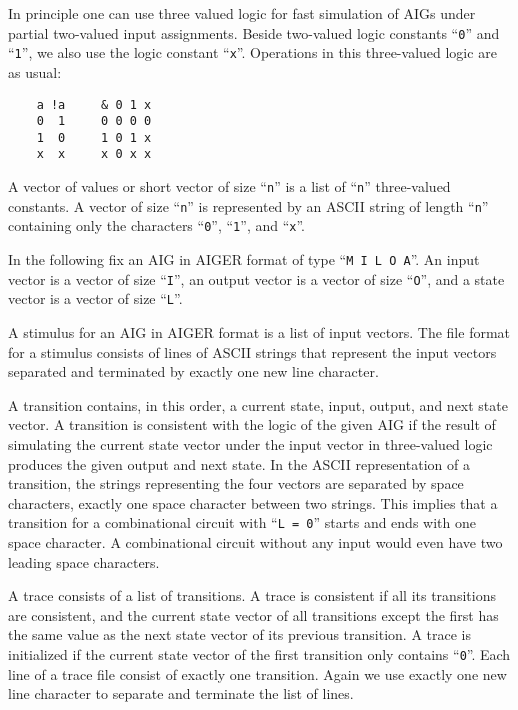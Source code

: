 \documentclass{llncs}
\begin{document}
  In principle one can use three valued logic for fast simulation of AIGs
  under partial two-valued input assignments.  Beside two-valued logic
  constants ``\texttt{0}'' and ``\texttt{1}'', we also use the logic constant
  ``\texttt{x}''.  Operations in
  this three-valued logic are as usual:

\begin{verbatim}
    a !a     & 0 1 x
    0  1     0 0 0 0
    1  0     1 0 1 x
    x  x     x 0 x x
\end{verbatim}

  A vector of values or short vector of size ``\texttt{n}'' is a list of
  ``\texttt{n}''
  three-valued constants.  A vector of size ``\texttt{n}'' is represented by
  an ASCII string of length ``\texttt{n}'' containing only the characters
  ``\texttt{0}'',
  ``\texttt{1}'', and ``\texttt{x}''.

  In the following fix an AIG in AIGER format of type ``\texttt{M I L O A}''.  An input
  vector is a vector of size ``\texttt{I}'', an output vector is a vector of size
  ``\texttt{O}'',
  and a state vector is a vector of size ``\texttt{L}''.

  A stimulus for an AIG in AIGER format is a list of input vectors.
  The file format for a stimulus consists of lines of ASCII strings that
  represent the input vectors separated and terminated by exactly one new
  line character.

  A transition contains, in this order, a current state, input, output, and
  next state vector.  A transition is consistent with the logic of the given
  AIG if the result of simulating the current state vector under the input
  vector in three-valued logic produces the given output and next state.  In
  the ASCII representation of a transition, the strings representing the
  four vectors are separated by space characters, exactly one space
  character between two strings.  This implies that a transition for a
  combinational circuit with ``\texttt{L = 0}'' starts and ends with one space
  character.  A combinational circuit without any input would even have two
  leading space characters.

  A trace consists of a list of transitions.  A trace is consistent if all
  its transitions are consistent, and the current state vector of all
  transitions except the first has the same value as the next state vector
  of its previous transition.  A trace is initialized if the current state
  vector of the first transition only contains ``\texttt{0}''.  Each line of a trace
  file consist of exactly one transition.  Again we use exactly one new line
  character to separate and terminate the list of lines.
  
\end{document}

